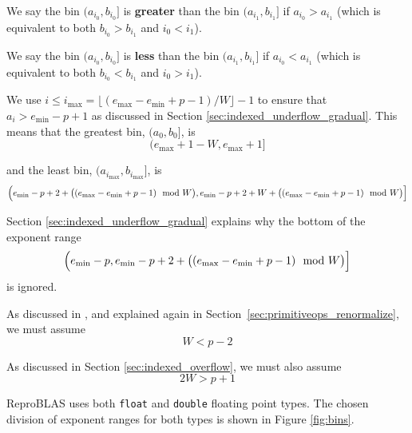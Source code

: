     We say the bin $(a_{i_0}, b_{i_0}]$ is \textbf{greater} than the bin
    $(a_{i_1}, b_{i_1}]$ if $a_{i_0} > a_{i_1}$ (which is equivalent to both
    $b_{i_0} > b_{i_1}$ and $i_0 < i_1$).

    We say the bin $(a_{i_0}, b_{i_0}]$ is \textbf{less} than the bin
    $(a_{i_1}, b_{i_1}]$ if $a_{i_0} < a_{i_1}$ (which is equivalent to both
    $b_{i_0} < b_{i_1}$ and $i_0 > i_1$).

    We use $i \leq i_{\max} = \lfloor(e_{\max} - e_{\min} + p - 1)/W\rfloor - 1$
    to ensure that $a_i > e_{\min} - p + 1$ as discussed in Section
    \ref{sec:indexed_underflow_gradual}. This means that the greatest bin,
    $(a_{0}, b_{0}]$, is
    \begin{equation}
      (e_{\max} + 1 - W, e_{\max} + 1]
      \label{eq:binmax}
    \end{equation}

    and the least bin, $(a_{i_{\max}}, b_{i_{\max}}]$, is
    \begin{equation}
      \Bigl(e_{\min} - p + 2 + \bigl((e_{\max} - e_{\min} + p - 1)\mod W\bigr),
      e_{\min} - p + 2 + W + \bigl((e_{\max} - e_{\min} + p - 1)\mod W\bigr)\Bigr]
      \label{eq:binmin}
    \end{equation}

    Section \ref{sec:indexed_underflow_gradual} explains why the bottom of the exponent range
    \begin{equation*}
    \Bigl(e_{\min} - p, e_{\min} - p + 2 + \bigl((e_{\max} - e_{\min} + p - 1) \mod W\bigr)\Bigr]
    \end{equation*}
    is ignored.

    As discussed in \cite{repsum}, and explained again in Section~\ref{sec:primitiveops_renormalize},
    we must assume
    \begin{equation}
      W < p - 2
      \label{eq:wupper}
    \end{equation}

    As discussed in Section \ref{sec:indexed_overflow}, we must also assume
    \begin{equation}
      2 W > p + 1
      \label{eq:wlower}
    \end{equation}

    ReproBLAS uses both \texttt{float} and \texttt{double} floating point
    types. The chosen division of exponent ranges for both types is shown in
    Figure \ref{fig:bins}.

